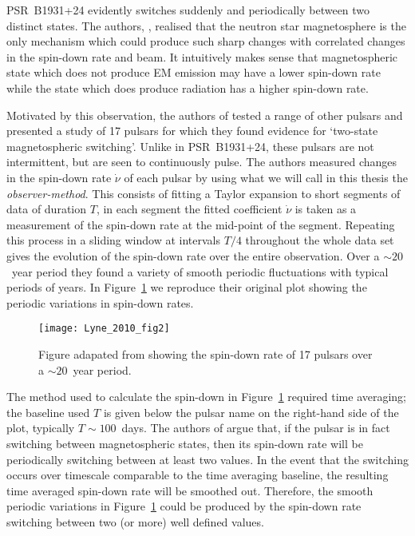 PSR~B1931+24 evidently switches suddenly and periodically between two distinct
states. The authors, \citet{Kramer2006}, realised that the neutron star
magnetosphere is the only mechanism which could produce such sharp changes with
correlated changes in the spin-down rate and beam.  It intuitively makes sense
that magnetospheric state which does not produce EM emission may have a lower
spin-down rate while the state which does produce radiation has a higher
spin-down rate.

Motivated by this observation, the authors of \citet{Lyne2010} tested a range
of other pulsars and presented a study of 17 pulsars for which they found
evidence for `two-state magnetospheric switching'. Unlike in PSR~B1931+24,
these pulsars are not intermittent, but are seen to continuously pulse. The
authors measured changes in the spin-down rate $\dot{\nu}$ of each pulsar by
using what we will call in this thesis the \emph{observer-method}. This
consists of fitting a Taylor expansion to short segments of data of duration
$T$, in each segment the fitted coefficient $\dot{\nu}$ is taken as a
measurement of the spin-down rate at the mid-point of the segment. Repeating
this process in a sliding window at intervals $T/4$ throughout the whole data set gives the
evolution of the spin-down rate over the entire observation.  Over a
$\sim20$~year period they found a variety of smooth periodic fluctuations with
typical periods of years. In Figure~\ref{fig: lyne 2010 fig2} we reproduce their
original plot showing the periodic variations in spin-down rates.
\begin{figure}
    \centering
    \texttt{[image: Lyne\_2010\_fig2]}
    \caption{Figure adapated from \citet{Lyne2010} showing the spin-down rate
             of 17 pulsars over a $\sim20$~year period.}
    \label{fig: lyne 2010 fig2}
\end{figure}

The method used to calculate the spin-down in Figure~\ref{fig: lyne 2010 fig2}
required time averaging; the baseline used $T$ is given below the pulsar name
on the right-hand side of the plot, typically $T\sim100$~days. The authors of
\citet{Lyne2010} argue that, if the pulsar is in fact switching between
magnetospheric states, then its spin-down rate will be periodically switching
between at least two values. In the event that the switching occurs over
timescale comparable to the time averaging baseline, the resulting time averaged
spin-down rate will be smoothed out. Therefore, the smooth periodic variations in
Figure~\ref{fig: lyne 2010 fig2} could be produced by the spin-down rate
switching between two (or more) well defined values.


